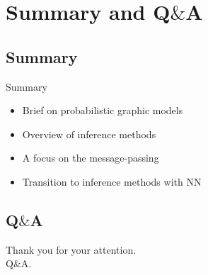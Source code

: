
\section{Summary and Q$\&$A}
\subsection{Summary}
\begin{frame}{Summary}
  \begin{itemize}[label=$\bullet$]
  \item Brief on probabilistic graphic models
  \item Overview of inference methods
  \item A focus on the message-passing
  \item Transition to inference methods with NN
  \end{itemize}
\end{frame}
\subsection{Q$\&$A}

{ 
  \begin{frame}
    \begin{center}
      {\large Thank you for your attention.}\\
      {\large Q$\&$A.}
    \end{center}
    
  \end{frame}
}


